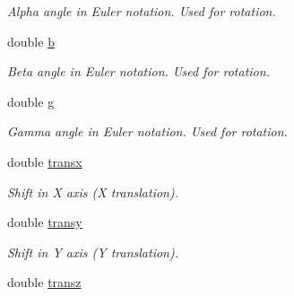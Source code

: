 \begin{DoxyCompactItemize}
\begin{DoxyCompactList}\small\item\em Alpha angle in Euler notation. Used for rotation. \item\end{DoxyCompactList}\item 
\hypertarget{classTEMP__SCHEME_afcb692a569a6aae84efec903d81e9726}{
double \hyperlink{classTEMP__SCHEME_afcb692a569a6aae84efec903d81e9726}{b}}
\label{classTEMP__SCHEME_afcb692a569a6aae84efec903d81e9726}

\begin{DoxyCompactList}\small\item\em Beta angle in Euler notation. Used for rotation. \item\end{DoxyCompactList}\item 
\hypertarget{classTEMP__SCHEME_aac0b16fb2f71fa7446e8b0ad7759532e}{
double \hyperlink{classTEMP__SCHEME_aac0b16fb2f71fa7446e8b0ad7759532e}{g}}
\label{classTEMP__SCHEME_aac0b16fb2f71fa7446e8b0ad7759532e}

\begin{DoxyCompactList}\small\item\em Gamma angle in Euler notation. Used for rotation. \item\end{DoxyCompactList}\item 
\hypertarget{classTEMP__SCHEME_aded7d53927d932226335caf3186ca58e}{
double \hyperlink{classTEMP__SCHEME_aded7d53927d932226335caf3186ca58e}{transx}}
\label{classTEMP__SCHEME_aded7d53927d932226335caf3186ca58e}

\begin{DoxyCompactList}\small\item\em Shift in X axis (X translation). \item\end{DoxyCompactList}\item 
\hypertarget{classTEMP__SCHEME_a456b4e5e76ce97bcb2f465fad1e25073}{
double \hyperlink{classTEMP__SCHEME_a456b4e5e76ce97bcb2f465fad1e25073}{transy}}
\label{classTEMP__SCHEME_a456b4e5e76ce97bcb2f465fad1e25073}

\begin{DoxyCompactList}\small\item\em Shift in Y axis (Y translation). \item\end{DoxyCompactList}\item 
\hypertarget{classTEMP__SCHEME_a5c6cf43fb449e601bf8af1017643f244}{
double \hyperlink{classTEMP__SCHEME_a5c6cf43fb449e601bf8af1017643f244}{transz}}
\label{classTEMP__SCHEME_a5c6cf43fb449e601bf8af1017643f244}


\end{DoxyCompactItemize}
